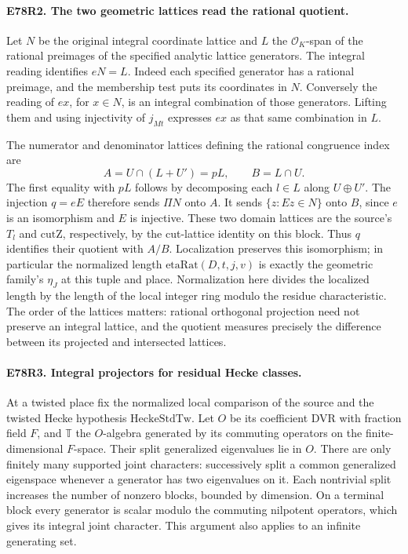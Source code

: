 \paragraph{E78R2. The two geometric lattices read the rational quotient.}
Let $N$ be the original integral coordinate lattice and $L$ the
$\mathcal O_K$-span of the rational preimages of the specified analytic
lattice generators. The integral reading identifies $eN=L$.
Indeed each specified generator has a rational preimage, and the
membership test puts its coordinates in $N$. Conversely the
reading of $ex$, for $x\in N$, is an integral combination of those
generators. Lifting them and using injectivity of $j_{Mt}$ expresses
$ex$ as that same combination in $L$.

The numerator and denominator lattices defining the rational congruence
index are
\[
 A=U\cap(L+U')=pL,\qquad B=L\cap U.
\]
The first equality with $pL$ follows by decomposing each $l\in L$
along $U\oplus U'$. The injection $q=eE$ therefore sends $\Pi N$
onto $A$. It sends $\{z:Ez\in N\}$ onto $B$, since $e$ is an
isomorphism and $E$ is injective. These two domain lattices are the
source's $T_l$ and $\mathrm{cutZ}$, respectively, by the
cut-lattice identity on this block. Thus $q$ identifies their
quotient with $A/B$. Localization preserves this isomorphism;
in particular the normalized length $\mathrm{etaRat}(D,t,j,v)$ is
exactly the geometric family's $\eta_J$ at this tuple and place.
Normalization here divides the localized length by the length of
the local integer ring modulo the residue characteristic.
The order of the lattices matters: rational orthogonal projection
need not preserve an integral lattice, and the quotient measures
precisely the difference between its projected and intersected lattices.

\paragraph{E78R3. Integral projectors for residual Hecke classes.}
At a twisted place fix the normalized local comparison of the
source and the twisted Hecke hypothesis $\mathrm{HeckeStdTw}$.
Let $O$ be its coefficient DVR with fraction field $F$, and
$\mathbb T$ the $O$-algebra generated by its commuting operators on
the finite-dimensional $F$-space. Their split generalized eigenvalues
lie in $O$. There are only finitely many supported joint characters:
successively split a common generalized eigenspace whenever a
generator has two eigenvalues on it. Each nontrivial split increases
the number of nonzero blocks, bounded by dimension. On a terminal
block every generator is scalar modulo the commuting nilpotent
operators, which gives its integral joint character. This argument
also applies to an infinite generating set.

